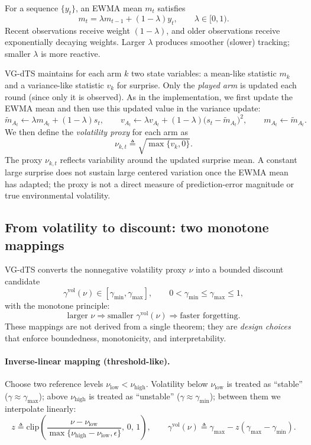 For a sequence $\{y_t\}$, an EWMA mean $m_t$ satisfies
\[
m_t=\lambda m_{t-1}+(1-\lambda)y_t,\qquad \lambda\in[0,1).
\]
Recent observations receive weight $(1-\lambda)$, and older observations receive exponentially decaying weights. Larger $\lambda$ produces smoother (slower) tracking; smaller $\lambda$ is more reactive.

VG-dTS maintains for each arm $k$ two state variables: a mean-like statistic $m_k$ and a variance-like statistic $v_k$ for surprise.
Only the \emph{played arm} is updated each round (since only it is observed). As in the implementation, we first update the EWMA mean and then use this updated value in the variance update:
\begin{equation}
\widetilde{m}_{A_t} \leftarrow \lambda m_{A_t} + (1-\lambda)s_t,\qquad
v_{A_t} \leftarrow \lambda v_{A_t} + (1-\lambda)\bigl(s_t-\widetilde{m}_{A_t}\bigr)^2,\qquad
m_{A_t}\leftarrow \widetilde{m}_{A_t}.
\label{eq:apx_ewma}
\end{equation}
We then define the \emph{volatility proxy} for each arm as
\begin{equation}
\nu_{k,t}\triangleq \sqrt{\max\{v_k,0\}}.
\label{eq:apx_volproxy}
\end{equation}
The proxy $\nu_{k,t}$ reflects variability around the updated surprise mean. A constant large surprise does not sustain large centered variation once the EWMA mean has adapted; the proxy is not a direct measure of prediction-error magnitude or true environmental volatility.

\subsection{From volatility to discount: two monotone mappings}
VG-dTS converts the nonnegative volatility proxy $\nu$ into a bounded discount candidate
\[
\gamma^{\mathrm{vol}}(\nu)\in[\gamma_{\min},\gamma_{\max}],\qquad 0<\gamma_{\min}\le \gamma_{\max}\le 1,
\]
with the monotone principle:
\[
\text{larger }\nu \Rightarrow \text{smaller }\gamma^{\mathrm{vol}}(\nu)\Rightarrow \text{faster forgetting}.
\]
These mappings are not derived from a single theorem; they are \emph{design choices} that enforce boundedness, monotonicity, and interpretability.

\paragraph{Inverse-linear mapping (threshold-like).}
Choose two reference levels $\nu_{\mathrm{low}}<\nu_{\mathrm{high}}$.
Volatility below $\nu_{\mathrm{low}}$ is treated as ``stable'' ($\gamma\approx\gamma_{\max}$);
above $\nu_{\mathrm{high}}$ is treated as ``unstable'' ($\gamma\approx\gamma_{\min}$);
between them we interpolate linearly:
\begin{equation}
z \triangleq \mathrm{clip}\!\left(\frac{\nu-\nu_{\mathrm{low}}}{\max\{\nu_{\mathrm{high}}-\nu_{\mathrm{low}},\epsilon\}},\,0,\,1\right),\qquad
\gamma^{\mathrm{vol}}(\nu)\triangleq \gamma_{\max}-z(\gamma_{\max}-\gamma_{\min}).
\label{eq:apx_map_linear}
\end{equation}

